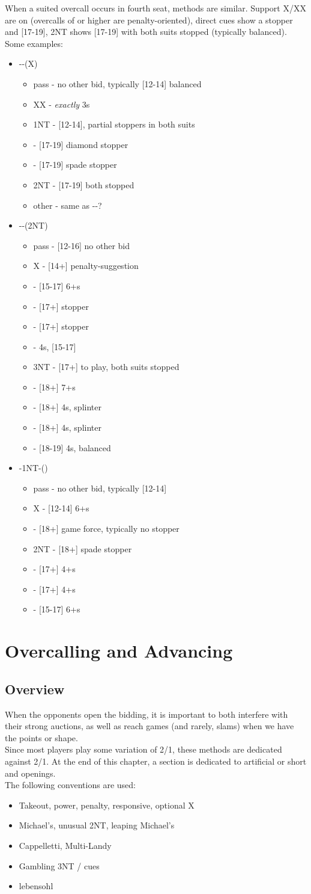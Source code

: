 \documentclass[12pt]{report}
\newcommand{\n}{\\}
\newcommand{\ul}[1]{\begin{itemize}#1\end{itemize}}
\newcommand{\li}{\item[~]}
\begin{document}
    When a suited overcall occurs in fourth seat, methods are similar.  Support X/XX are on (overcalls of  or higher are penalty-oriented), direct cues show a stopper and [17-19], 2NT shows [17-19] with both suits stopped (typically balanced).  Some examples:

    \ul {
        \li {}--(X)
        \ul {
            \li pass - no other bid, typically [12-14] balanced
            \li XX - \textit{exactly} 3\he{}s
            \li 1NT - [12-14], partial stoppers in both suits
            \li \di2 - [17-19] diamond stopper
            \li \sp2 - [17-19] spade stopper
            \li 2NT - [17-19] both stopped
            \li other - same as \cl1-\he1-?
        }
        \li \cl1-\sp1-(2NT)
        \ul {
            \li pass - [12-16] no other bid
            \li X - [14+] penalty-suggestion
            \li \cl3 - [15-17] 6+\cl{}s
            \li \di3 - [17+] stopper
            \li \he3 - [17+] stopper
            \li \sp3 - 4\sp{}s, [15-17]
            \li 3NT - [17+] to play, both suits stopped
            \li \cl4 - [18+] 7+\cl{}s
            \li \di4 - [18+] 4\sp{}s, splinter
            \li \di4 - [18+] 4\he{}s, splinter
            \li \sp4 - [18-19] 4\sp{}s, balanced
        }
        \li \he1-1NT-(\he2)
        \ul {
            \li pass - no other bid, typically [12-14]
            \li X - [12-14] 6+\he{}s
            \li \sp2 - [18+] game force, typically no stopper
            \li 2NT - [18+] spade stopper
            \li \cl3 - [17+] 4+\cl{}s
            \li \di3 - [17+] 4+\di{}s
            \li \he3 - [15-17] 6+\he{}s
        }
    }
\chapter{Overcalling and Advancing}
\section{Overview} \label{4:1}
    
    When the opponents open the bidding, it is important to both interfere with their strong auctions, as well as reach games (and rarely, slams) when we have the points or shape.\n

    Since most players play some variation of 2/1, these methods are dedicated against 2/1.  At the end of this chapter, a section is dedicated to artificial or short  and  openings. \n

    The following conventions are used:
    \begin{itemize} \itemsep0em
        \item Takeout, power, penalty, responsive, optional X
        \item Michael's, unusual 2NT, leaping Michael's
        \item Cappelletti, Multi-Landy
        \item Gambling 3NT / cues
        \item lebensohl\n
    \end{itemize}
\end{document}

